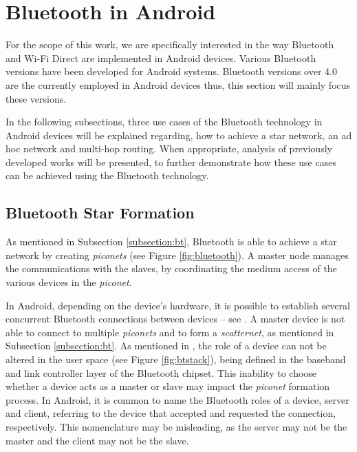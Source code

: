 \section{Bluetooth in Android}

For the scope of this work, we are specifically interested in the way Bluetooth and Wi-Fi Direct are implemented in Android devices. Various Bluetooth versions have been developed for Android systems. Bluetooth versions over 4.0 are the currently employed in Android devices thus, this section will mainly focus these versions.

In the following subsections, three use cases of the Bluetooth technology in Android devices will be explained regarding, how to achieve a star network, an ad hoc network and multi-hop routing. When appropriate, analysis of previously developed works will be presented, to further demonstrate how these use cases can be achieved using the Bluetooth technology.

\subsection{Bluetooth Star Formation}
\label{subsec:btstar}

As mentioned in Subsection \ref{subsection:bt}, Bluetooth is able to achieve a star network by creating \textit{piconets} (see Figure \ref{fig:bluetooth}). A master node manages the communications with the slaves, by coordinating the medium access of the various devices in the \textit{piconet}.

In Android, depending on the device's hardware, it is possible to establish several concurrent Bluetooth connections between devices -- see \cite{btmultipleconn}. A master device is not able to connect to multiple \textit{piconets} and to form a \textit{scatternet}, as mentioned in Subsection \ref{subsection:bt}. As mentioned in \cite{btmasterchoice}, the role of a device can not be altered in the user space (see Figure \ref{fig:btstack}), being defined in the baseband and link controller layer of the Bluetooth chipset. This inability to choose whether a device acts as a master or slave may impact the \textit{piconet} formation process. In Android, it is common to name the Bluetooth roles of a device, server and client, referring to the device that accepted and requested the connection, respectively. This nomenclature may be misleading, as the server may not be the master and the client may not be the slave.

